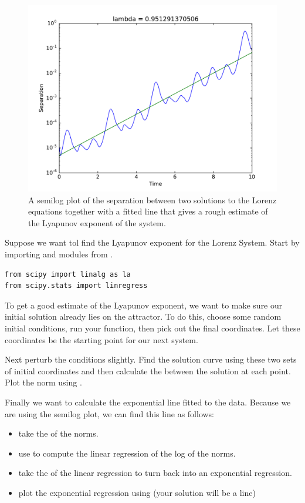 \begin{figure}
\includegraphics[width=\textwidth]{figures/semilog.pdf}
\caption{A semilog plot of the separation between two solutions to the Lorenz equations together with a fitted line that gives a rough estimate of the Lyapunov exponent of the system.}
\label{fig:lyapunov_exponent}
\end{figure}

Suppose we want tol find the Lyapunov exponent for the Lorenz System.
Start by importing  and  modules from .
\begin{lstlisting}
from scipy import linalg as la
from scipy.stats import linregress
\end{lstlisting}
To get a good estimate of the Lyapunov exponent, we want to make sure our initial solution already lies on the attractor.
To do this, choose some random initial conditions, run your  function, then pick out the final coordinates.
Let these coordinates be the starting point for our next system.

Next perturb the conditions slightly.
Find the solution curve using these two sets of initial coordinates and then calculate the  between the solution at each point.
Plot the norm using .

Finally we want to calculate the exponential line fitted to the data.
Because we are using the semilog plot, we can find this line as follows:
\begin{itemize}
\item take the  of the norms.
\item use  to compute the linear regression of the log of the norms.
\item take the  of the linear regression to turn back into an exponential regression.
\item plot the exponential regression using  (your solution will be a line)
\end{itemize}


